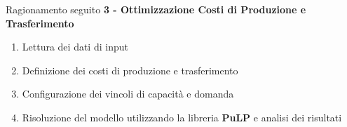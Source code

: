 \documentclass{beamer}
\begin{document}
\begin{frame}{Ragionamento seguito}
    \textbf{3 - Ottimizzazione Costi di Produzione e Trasferimento}
    \begin{enumerate}
        \item Lettura dei dati di input
        \item Definizione dei costi di produzione e trasferimento
        \item Configurazione dei vincoli di capacità e domanda
        \item Risoluzione del modello utilizzando la libreria \textbf{PuLP} e analisi dei risultati
    \end{enumerate}
\end{frame}
\end{document}
